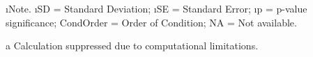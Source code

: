 \begin{tablenotes}
    \small
      \item \i{Note}. \i{SD} = Standard Deviation; \i{SE} = Standard Error; \i{p} = p-value significance; CondOrder = Order of Condition; NA = Not available. \item[a] Calculation suppressed due to computational limitations.
      \end{tablenotes} 